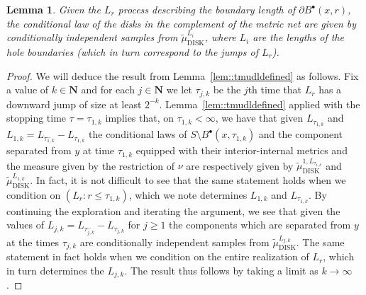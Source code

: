 \documentclass[JEP,XML,SOM,Unicode]{cedram}
\newcommand{\sbullet}{{\scriptscriptstyle\bullet}}
\theoremstyle{plain}
\numberwithin{theorem}{section}
\newtheorem{lemma}[theorem]{Lemma}
\theoremstyle{definition}
\newcommand{\N}{\mathbf{N}}
\def\tmudlset#1{\wt{\mu}_{\mathrm{DISK}}^{#1}}
\def\tmudonelset#1{\wt{\mu}_{ \mathrm{DISK}}^{1, #1}}
\let\wt\widetilde
\newcommand{\fb}[2]{B^\sbullet(#1,#2)}
\begin{document}
\begin{lemma}
\label{lem::explore_to_marked_point}
Given the $L_r$ process describing the boundary length of $\partial \fb{x}{r}$, the conditional law of the disks in the complement of the metric net are given by conditionally independent samples from $\tmudlset{L_i}$, where $L_i$ are the lengths of the hole boundaries (which in turn correspond to the jumps of $L_r$).
\end{lemma}
\begin{proof}
We will deduce the result from Lemma~\ref{lem::tmudldefined} as follows. Fix a value of $k \in \N$ and for each $j \in \N$ we let $\tau_{j,k}$ be the $j$th time that $L_r$ has a downward jump of size at least $2^{-k}$. Lemma~\ref{lem::tmudldefined} applied with the stopping time $\tau = \tau_{1,k}$ implies that, on $\tau_{1,k} < \infty$, we have that given $L_{\tau_{1,k}}$ and $L_{1,k} = L_{\tau_{1,k}^-} - L_{\tau_{1,k}}$ the conditional laws of $S \setminus \fb{x}{\tau_{1,k}}$ and the component separated from $y$ at time $\tau_{1,k}$ equipped with their interior-internal metrics and the measure given by the restriction of $\nu$ are respectively given by $\tmudonelset{L_{\tau_{1,k}}}$ and $\tmudlset{L_{1,k}}$. In fact, it is not difficult to see that the same statement holds when we condition on $(L_r : r \leq \tau_{1,k})$, which we note determines $L_{1,k}$ and $L_{\tau_{1,k}}$. By continuing the exploration and iterating the argument, we see that given the values of $L_{j,k} = L_{\tau_{j,k}^-} - L_{\tau_{j,k}}$ for $j \geq 1$ the components which are separated from $y$ at the times $\tau_{j,k}$ are conditionally independent samples from $\tmudlset{L_{j,k}}$. The same statement in fact holds when we condition on the entire realization of $L_r$, which in turn determines the $L_{j,k}$. The result thus follows by taking a limit as $k \to \infty$.
\end{proof}
\end{document}
